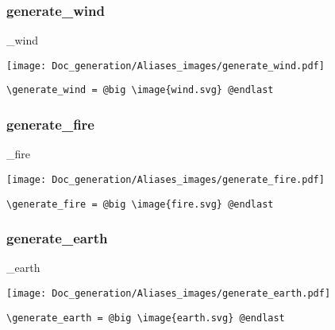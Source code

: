 \documentclass{article}
\begin{document}
\subsubsection{generate\_wind}
\begin{minipage}{0.45\linewidth}
\raggedright
\begin{spverbatim}
\generate_wind
\end{spverbatim}
\end{minipage}
\begin{minipage}{0.45\linewidth}
\raggedleft
\texttt{[image: Doc\_generation/Aliases\_images/generate\_wind.pdf]}
\end{minipage}
\begin{center}
\begin{BVerbatim}
\generate_wind = @big \image{wind.svg} @endlast
\end{BVerbatim}
\end{center}

\subsubsection{generate\_fire}
\begin{minipage}{0.45\linewidth}
\raggedright
\begin{spverbatim}
\generate_fire
\end{spverbatim}
\end{minipage}
\begin{minipage}{0.45\linewidth}
\raggedleft
\texttt{[image: Doc\_generation/Aliases\_images/generate\_fire.pdf]}
\end{minipage}
\begin{center}
\begin{BVerbatim}
\generate_fire = @big \image{fire.svg} @endlast
\end{BVerbatim}
\end{center}

\subsubsection{generate\_earth}
\begin{minipage}{0.45\linewidth}
\raggedright
\begin{spverbatim}
\generate_earth
\end{spverbatim}
\end{minipage}
\begin{minipage}{0.45\linewidth}
\raggedleft
\texttt{[image: Doc\_generation/Aliases\_images/generate\_earth.pdf]}
\end{minipage}
\begin{center}
\begin{BVerbatim}
\generate_earth = @big \image{earth.svg} @endlast
\end{BVerbatim}
\end{center}
\end{document}
